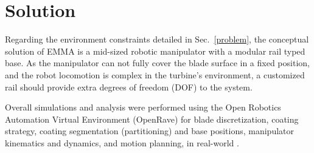 \section{Solution}


Regarding the environment constraints detailed in Sec.~\ref{problem}, the
conceptual solution of EMMA is a mid-sized robotic manipulator with a modular
rail typed base. As the manipulator can not fully cover the blade surface in a
fixed position, and the robot locomotion is complex in the turbine's
environment, a customized rail should provide extra degrees of freedom (DOF) to
the system.

Overall simulations and analysis were performed using the Open Robotics
Automation Virtual Environment (OpenRave) for blade discretization, coating
strategy, coating segmentation (partitioning) and base positions, manipulator
kinematics and dynamics, and motion planning, in real-world
\cite{diankov2008openrave}. 


\begin{comment}
Several concepts for robotic base were
simulated and the simpler solution in constructive terms was chosen,
consisting of a Prismatic-Rotational-Prismatic-Prismatic (PRPP) base.



The coating solution used in industry today is to oversize the robot
in means of its reach, such that one fixed and large base is enough to do all 
the process without moving the robot's base. 
This is feasible because there are no constraints regarding to its size and no
other objects but the blade in an optimal position, in a specially designed room.

Because of the small access to the interior of the turbine and the narrow space
between the blades, this solution requires a midsize to small robot. 
These manipulators cannot reach all the surface of the blade without moving its
base, so an external base need to provide degrees of freedom (DOF) that allow
the manipulator to reach all the surface.
A geometric and kinematic study was made to find the required positions of the
robot's base that allow the complete coverage of the blade.
From this, were studied several base concepts regarding to the DOF and joints of
the base. The simpler solution in constructive terms was chosen, and consists of
a Prismatic-Rotational-Prismatic-Prismatic (PRPP) joints.
\end{comment}


